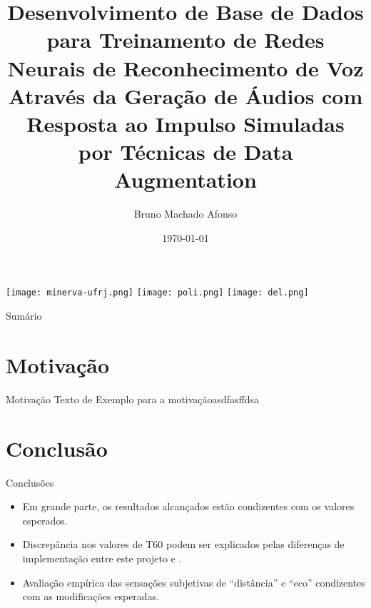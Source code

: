 \documentclass{libs/XJTLU_format}
\title[Defesa de Projeto de Graduação]{\normalsize\textbf{Desenvolvimento de Base de Dados para Treinamento de Redes Neurais de Reconhecimento de Voz
Através da Geração de Áudios com Resposta ao Impulso Simuladas por Técnicas de Data Augmentation}}
\author{Bruno Machado Afonso}
\institute[- Escola Politécnica]{
    \email{bruno.ma@poli.ufrj.br}
    \newline
    \department{\scriptsize Departamento de Engenharia Eletrônica e de Computação - Escola Politécnica}
    \newline
    \university{\scriptsize Universidade Federal do Rio de Janeiro}
}
\date{\today}
\begin{document}


\begin{frame}{}
    \texttt{[image: minerva-ufrj.png]} \hspace{3cm} \vspace{-0.2cm}
    \texttt{[image: poli.png]} \hspace{2cm} \vspace{-0.2cm}
    \texttt{[image: del.png]} \hspace{-0.1cm} \vspace{-0.1cm}
    \maketitle
\end{frame} 

\begin{frame}{Sumário}
    \begin{multicols}{2}
        \tableofcontents
    \end{multicols}
\end{frame}

\section{Motivação}

\begin{frame}{Motivação}
    Texto de Exemplo para a motivaçãoasdfasffdsa
\end{frame}


\section{Conclusão}

\begin{frame} {Conclusões}
    \begin{itemize}
        \justifying
        \item Em grande parte, os resultados alcançados estão condizentes com os valores esperados.
        \item Discrepância nos valores de T60 podem ser explicados pelas diferenças de implementação entre este projeto e \cite{RIR_Data_Aug}.
        \item Avaliação empírica das sensações subjetivas de “distância” e “eco” condizentes com as modificações esperadas.
    \end{itemize}
\end{frame}
\end{document}
